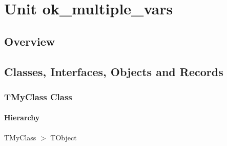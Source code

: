 \documentclass{report}
\newif\ifpdf
\begin{document}
\label{toc}\tableofcontents
\newpage
\newlength{\tmplength}
\chapter{Unit ok{\_}multiple{\_}vars}
\label{ok_multiple_vars}
\section{Overview}
\begin{description}
\item[\texttt{\begin{ttfamily}TMyClass\end{ttfamily} Class}]
\end{description}
\section{Classes, Interfaces, Objects and Records}
\ifpdf
\subsection*{\large{\textbf{TMyClass Class}}\normalsize\hspace{1ex}\hrulefill}
\else
\subsection*{TMyClass Class}
\fi
\label{ok_multiple_vars.TMyClass}
\subsubsection*{\large{\textbf{Hierarchy}}\normalsize\hspace{1ex}\hfill}
TMyClass {$>$} TObject
\end{document}
